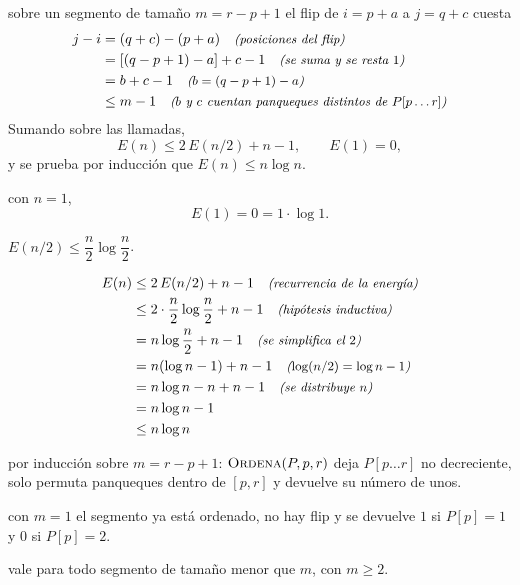 \documentclass[11pt,letterpaper]{article}
\begin{document}
 sobre un segmento de tamaño $m = r - p + 1$ el flip
de $i = p + a$ a $j = q + c$ cuesta
\begin{align*}
  j - i &= (q + c) - (p + a) \quad\text{\small\itshape (posiciones del flip)} \\
        &= \left[(q - p + 1) - a\right] + c - 1
           \quad\text{\small\itshape (se suma y se resta $1$)} \\
        &= b + c - 1 \quad\text{\small\itshape ($b = (q - p + 1) - a$)} \\
        &\le m - 1
           \quad\text{\small\itshape ($b$ y $c$ cuentan panqueques distintos de
                  $P[p \ldots r]$)}
\end{align*}
Sumando sobre las llamadas,
\[
  E(n) \le 2\,E(n/2) + n - 1, \qquad E(1) = 0,
\]
y se prueba por inducción que $E(n) \le n \log n$.

 con $n = 1$,
\[
  E(1) = 0 = 1 \cdot \log 1.
\]

 $E(n/2) \le \dfrac{n}{2} \log \dfrac{n}{2}$.

\begin{align*}
  E(n) &\le 2\,E(n/2) + n - 1 \quad\text{\small\itshape (recurrencia de la energía)} \\
       &\le 2 \cdot \frac{n}{2} \log \frac{n}{2} + n - 1
          \quad\text{\small\itshape (hipótesis inductiva)} \\
       &= n \log \frac{n}{2} + n - 1 \quad\text{\small\itshape (se simplifica el $2$)} \\
       &= n (\log n - 1) + n - 1
          \quad\text{\small\itshape ($\log(n/2) = \log n - 1$)} \\
       &= n \log n - n + n - 1 \quad\text{\small\itshape (se distribuye $n$)} \\
       &= n \log n - 1 \\
       &\le n \log n
\end{align*}

 por inducción sobre $m = r - p + 1$:
$\textsc{Ordena}(P, p, r)$ deja $P[p \ldots r]$ no decreciente, solo
permuta panqueques dentro de $[p, r]$ y devuelve su número de unos.

 con $m = 1$ el segmento ya está ordenado, no hay
flip y se devuelve $1$ si $P[p] = 1$ y $0$ si $P[p] = 2$.

 vale para todo segmento de tamaño menor
que $m$, con $m \ge 2$.
\end{document}
